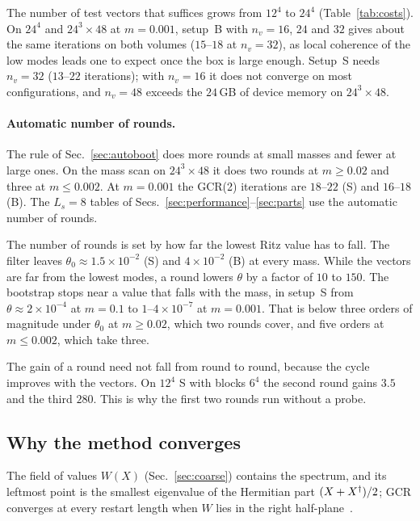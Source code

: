 The number of test vectors that suffices grows from $12^4$ to $24^4$ (Table~\ref{tab:costs}).
\New On $24^4$ and $24^3\times48$ at $m=0.001$, setup~B with $n_v=16$, $24$ and $32$ gives about the
same iterations on both volumes ($15$--$18$ at $n_v=32$), as local coherence of the low modes
leads one to expect once the box is large enough. Setup~S needs $n_v=32$ ($13$--$22$ iterations); with
$n_v=16$ it does not converge on most configurations, and $n_v=48$ exceeds the $24$\,GB of device
memory on $24^3\times48$.

\paragraph{\New Automatic number of rounds.}
\label{sec:autorounds}
The rule of Sec.~\ref{sec:autoboot} does more rounds at small masses and fewer at large ones.
On the mass scan on $24^3\times48$ it does two rounds at $m\ge0.02$ and three at
$m\le0.002$. At $m=0.001$ the GCR(2) iterations are $18$--$22$ (S) and $16$--$18$ (B)\New{}. The
$L_s=8$ tables of Secs.~\ref{sec:performance}--\ref{sec:parts} use the automatic number of rounds.

The number of rounds is set by how far the lowest Ritz value has to fall. The filter leaves
$\theta_0\approx1.5\times10^{-2}$ (S) and $4\times10^{-2}$ (B) at every mass. While the vectors are
far from the lowest modes, a round lowers $\theta$ by a factor of $10$ to $150$. The bootstrap stops
near a value that falls with the mass, in setup~S from $\theta\approx2\times10^{-4}$ at $m=0.1$ to
$1$--$4\times10^{-7}$ at $m=0.001$. That is below three orders of magnitude under $\theta_0$ at
$m\ge0.02$, which two rounds cover, and five orders at $m\le0.002$, which take three.

\New The gain of a round need not fall from round to round, because the cycle improves with the
vectors. On $12^4$ S with blocks $6^4$ the second round gains $3.5$ and the third $280$. This is why the first two rounds run without a probe.

\subsection{Why the method converges}
\label{sec:why}

\New The field of values $W(X)$ (Sec.~\ref{sec:coarse}) contains the spectrum, and its leftmost point is the smallest eigenvalue
of the Hermitian part $(X+X^{\dagger})/2$; GCR converges at every restart length when $W$ lies in the
right half-plane~\cite{ESS}.

